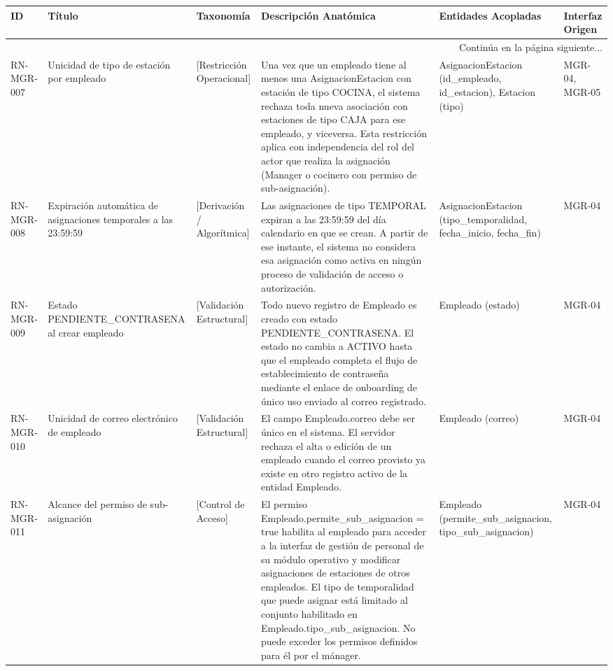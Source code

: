 \begin{landscape}
\begin{longtable}[c]{l p{2.1cm} p{2.1cm} p{8cm} p{4cm} p{3cm}}
\toprule
\textbf{ID} & \textbf{Título} & \textbf{Taxonomía} & \textbf{Descripción Anatómica} & \textbf{Entidades Acopladas} & \textbf{Interfaz Origen} \\
\midrule
\endhead

\midrule
\multicolumn{6}{r}{\small Continúa en la página siguiente...} \\
\endfoot
\bottomrule
\endlastfoot

RN-MGR-007 & Unicidad de tipo de estación por empleado & [Restricción Operacional] & Una vez que un empleado tiene al menos una AsignacionEstacion con estación de tipo COCINA, el sistema rechaza toda nueva asociación con estaciones de tipo CAJA para ese empleado, y viceversa. Esta restricción aplica con independencia del rol del actor que realiza la asignación (Manager o cocinero con permiso de sub-asignación). & AsignacionEstacion (id\_empleado, id\_estacion), Estacion (tipo) & MGR-04, MGR-05 \\
\addlinespace
RN-MGR-008 & Expiración automática de asignaciones temporales a las 23:59:59 & [Derivación / Algorítmica] & Las asignaciones de tipo TEMPORAL expiran a las 23:59:59 del día calendario en que se crean. A partir de ese instante, el sistema no considera esa asignación como activa en ningún proceso de validación de acceso o autorización. & AsignacionEstacion (tipo\_temporalidad, fecha\_inicio, fecha\_fin) & MGR-04 \\
\addlinespace
RN-MGR-009 & Estado PENDIENTE\_CONTRASENA al crear empleado & [Validación Estructural] & Todo nuevo registro de Empleado es creado con estado PENDIENTE\_CONTRASENA. El estado no cambia a ACTIVO hasta que el empleado completa el flujo de establecimiento de contraseña mediante el enlace de onboarding de único uso enviado al correo registrado. & Empleado (estado) & MGR-04 \\
\addlinespace
RN-MGR-010 & Unicidad de correo electrónico de empleado & [Validación Estructural] & El campo Empleado.correo debe ser único en el sistema. El servidor rechaza el alta o edición de un empleado cuando el correo provisto ya existe en otro registro activo de la entidad Empleado. & Empleado (correo) & MGR-04 \\
\addlinespace
RN-MGR-011 & Alcance del permiso de sub-asignación & [Control de Acceso] & El permiso Empleado.permite\_sub\_asignacion = true habilita al empleado para acceder a la interfaz de gestión de personal de su módulo operativo y modificar asignaciones de estaciones de otros empleados. El tipo de temporalidad que puede asignar está limitado al conjunto habilitado en Empleado.tipo\_sub\_asignacion. No puede exceder los permisos definidos para él por el mánager. & Empleado (permite\_sub\_asignacion, tipo\_sub\_asignacion) & MGR-04 \\

\end{longtable}
\end{landscape}
